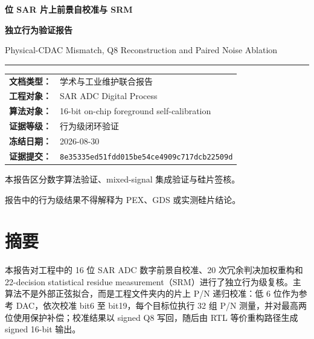 \documentclass[UTF8,fontset=none,a4paper,11pt,openany]{ctexrep}
\newcommand{\EvidenceCommit}{8e35335ed51fdd015be54ce4909c717dcb22509d}
\begin{document}
\begin{titlepage}
  \thispagestyle{empty}
  \centering
  \vspace*{2.25cm}
  {\ReferenceCJKTitle\bfseries\fontsize{17.22}{27} 位 SAR 片上前景自校准与 SRM\par}
  \vspace{0.35cm}
  {\ReferenceCJKTitle\bfseries\fontsize{17.22}{27}\selectfont
   独立行为验证报告\par}
  \vspace{0.55cm}
  {\large Physical-CDAC Mismatch, Q8 Reconstruction and Paired Noise Ablation\par}
  \vspace{0.9cm}
  {\color{RefNavy}\rule{0.25\textwidth}{1.1pt}\par}
  \vspace{1.3cm}
  \begin{tabular}{rl}
    \textbf{文档类型：} & 学术与工业维护联合报告\\
    \textbf{工程对象：} & SAR ADC Digital Process\\
    \textbf{算法对象：} & 16-bit on-chip foreground self-calibration\\
    \textbf{证据等级：} & 行为级闭环验证\\
    \textbf{冻结日期：} & 2026-08-30\\
    \textbf{证据提交：} & \texttt{\EvidenceCommit}\\
  \end{tabular}
  \vfill
  {\small
  本报告区分数字算法验证、mixed-signal 集成验证与硅片签核。\par
  报告中的行为级结果不得解释为 PEX、GDS 或实测硅片结论。\par}
  \vspace{1.0cm}
\end{titlepage}


\chapter*{摘要}

本报告对工程中的 16 位 SAR ADC 数字前景自校准、20 次冗余判决加权重构和 22-decision statistical residue measurement（SRM）进行了独立行为级复核。主算法不是外部正弦拟合，而是工程文件夹内的片上 P/N 递归校准：低 6 位作为参考 DAC，依次校准 bit6 至 bit19，每个目标位执行 32 组 P/N 测量，并对最高两位使用保护补偿；校准结果以 signed Q8 写回，随后由 RTL 等价重构路径生成 signed 16-bit 输出。
\end{document}
